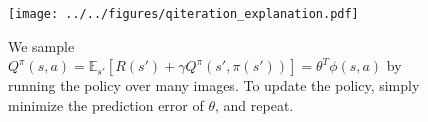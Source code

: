 \begin{figure}[ht]
\texttt{[image: ../../figures/qiteration\_explanation.pdf]}
\caption{
We sample $Q^\pi(s, a) = \mathbb{E}_{s'} \left[ R(s') + \gamma Q^\pi(s', \pi(s')) \right] = \theta^T \phi(s, a)$ by running the policy over many images.
To update the policy, simply minimize the prediction error of $\theta$, and repeat.
\label{fig:qiteration_explanation}}
\end{figure}
